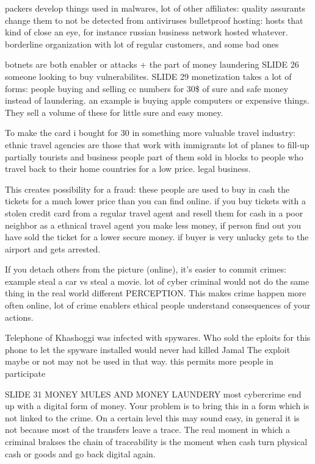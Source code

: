     packers develop things used in malwares, 
    lot of other affiliates: quality assurants change them to not be detected from antiviruses
    bulletproof hosting: hosts that kind of close an eye, for instance russian business network hosted whatever.
    borderline organization with lot of regular customers, and some bad ones
    
    botnets are both enabler or attacks
    + the part of money laundering
SLIDE 26
    someone looking to buy vulnerabilites.
SLIDE 29
    monetization takes a lot of forms:
        people buying and selling cc numbers for 30\$ of sure and safe money instead of laundering.
        an example is buying apple computers or expensive things.
        They sell a volume of these for little sure and easy money.
        
        To make the card i bought for 30 in something more valuable
            travel industry: ethnic travel agencies are those that work with immigrants
            lot of planes to fill-up 
            partially tourists and business people
            part of them sold in blocks to people who travel back to their home countries for a low price.
            legal business.

            This creates possibility for a fraud:
                these people are used to buy in cash the tickets for a much lower price than you can find online.
                if you buy tickets with a stolen credit card from a regular travel agent and resell them for cash in a poor neighbor as a ethnical travel agent
                you make less money, if person find out 
                you have sold the ticket for a lower secure money.
                if buyer is very unlucky gets to the airport and gets arrested.

    If you detach others from the picture (online), it's easier to commit crimes: example steal a car vs steal a movie.
    lot of cyber criminal would not do the same thing in the real world
    different PERCEPTION.
    This makes crime happen more often online,
    lot of crime enablers
    ethical people understand consequences of your actions.

Telephone of Khashoggi was infected with spywares.
Who sold the eploits for this phone to let the spyware installed would never had killed Jamal
The exploit maybe or not may not be used in that way.
this permits more people in participate

SLIDE 31 MONEY MULES AND MONEY LAUNDERY
    most cybercrime end up with a digital form of money.
    Your problem is to bring this in a form which is not linked to the crime.
    On a certain level this may sound easy, in general it is not because most of the transfers leave a trace.
    The real moment in which a criminal brakses the chain of traceability is the moment when cash turn physical cash or goods and go back digital again.


